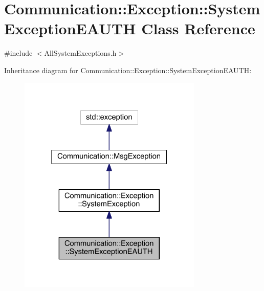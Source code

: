 \hypertarget{class_communication_1_1_exception_1_1_system_exception_e_a_u_t_h}{}\section{Communication\+:\+:Exception\+:\+:System\+Exception\+E\+A\+U\+T\+H Class Reference}
\label{class_communication_1_1_exception_1_1_system_exception_e_a_u_t_h}


{\ttfamily \#include $<$All\+System\+Exceptions.\+h$>$}



Inheritance diagram for Communication\+:\+:Exception\+:\+:System\+Exception\+E\+A\+U\+T\+H\+:\nopagebreak
\begin{figure}[H]
\begin{center}
\leavevmode
\includegraphics[width=248pt]{class_communication_1_1_exception_1_1_system_exception_e_a_u_t_h__inherit__graph}
\end{center}
\end{figure}


